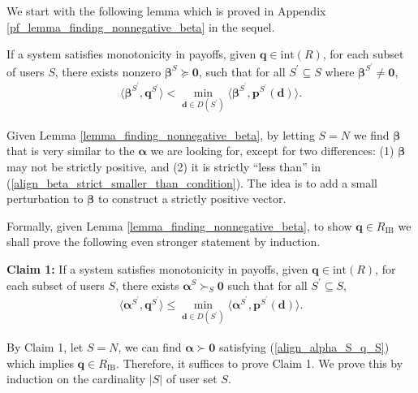 \documentclass[prodmode,acmtompecs]{acmsmall}
\newcommand{\reqvec}{\mathbf{q}}
\newcommand{\modelSatisfyPriorityImplication}{a system satisfies monotonicity in payoffs}
\newcommand{\concaveHull}{R}
\newcommand{\fullUserSet}{N}
\newcommand{\succS}[1]{\succ_{#1}}
\begin{document}
We start with the following lemma which is proved in Appendix \ref{pf_lemma_finding_nonnegative_beta} in the sequel. 

\begin{lemma}
\label{lemma_finding_nonnegative_beta}
If \modelSatisfyPriorityImplication, given $\mathbf{q} \in \text{int}(\concaveHull)$, for each subset of users $S$, there exists nonzero $\boldsymbol{\beta}^S \succeq \mathbf{0}$, such that for all $S^\prime \subseteq S$ where $\boldsymbol{\beta}^{S^\prime} \neq \mathbf{0}$,  
\begin{align}
\label{align_beta_strict_smaller_than_condition}
\langle \boldsymbol{\beta}^{S^\prime}, \mathbf{q}^{S^\prime} \rangle < \min\limits_{\mathbf{d} \in D(S^\prime)} \langle \boldsymbol{\beta}^{S^\prime},  \mathbf{p}^{S^\prime}(\mathbf{d}) \rangle. 
\end{align}
\end{lemma}

Given Lemma \ref{lemma_finding_nonnegative_beta}, by letting $S = \fullUserSet$ we find $\boldsymbol{\beta}$ that is very similar to the $\boldsymbol{\alpha}$ we are looking for, except for two differences: (1) $\boldsymbol{\beta}$ may not be strictly positive, and (2) it is strictly ``less than'' in (\ref{align_beta_strict_smaller_than_condition}). 
The idea is to add a small perturbation to $\boldsymbol{\beta}$ to construct a strictly positive vector. 

Formally, given Lemma \ref{lemma_finding_nonnegative_beta}, to show $\reqvec \in R_\text{IB}$ we shall prove the following even stronger statement by induction. 

{\bf Claim 1:} If \modelSatisfyPriorityImplication, given $\mathbf{q} \in \text{int}(\concaveHull)$, for each subset of users $S$, there exists $\boldsymbol{\alpha}^S \succS{S} \mathbf{0}$ such that for all $S^\prime \subseteq S$, 
\begin{align}
\label{align_alpha_S_prime_q_S_prime}
\langle \boldsymbol{\alpha}^{S^\prime}, \mathbf{q}^{S^\prime} \rangle \leq 
\min\limits_{\mathbf{d} \in D(S^\prime)} \langle \boldsymbol{\alpha}^{S^\prime}, \mathbf{p}^{S^\prime}(\mathbf{d}) \rangle. 
\end{align}

By Claim 1, let $S = \fullUserSet$, we can find $\boldsymbol{\alpha} \succ \mathbf{0}$ satisfying (\ref{align_alpha_S_q_S}) which implies $\mathbf{q} \in R_{\text{IB}}$. Therefore, it suffices to prove Claim 1. We prove this by induction on the cardinality $|S|$ of user set $S$. 
\end{document}
